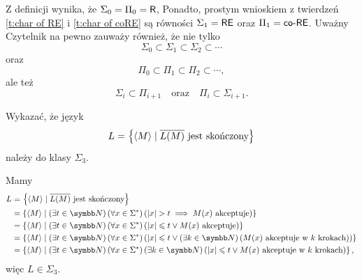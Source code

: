 Z definicji wynika, że $\Sigma_0 = \Pi_0 = \textsf{R}$, Ponadto, prostym wnioskiem z twierdzeń \ref{t:char of RE} i \ref{t:char of coRE} są równości $\Sigma_1 = \textsf{RE}$ oraz $\Pi_1 = \textsf{co-RE}$. Uważny Czytelnik na pewno zauważy również, że nie tylko
\[ \Sigma_0 \subset \Sigma_1 \subset \Sigma_2 \subset \cdots \]
oraz
\[ \Pi_0 \subset \Pi_1 \subset \Pi_2 \subset \cdots, \]
ale też
\[ \Sigma_i \subset \Pi_{i + 1} \quad\text{oraz}\quad \Pi_i \subset \Sigma_{i+1}. \]

\begin{example}
    Wykazać, że język
    \[ L = \left\{\left\langle M \right\rangle \mid \overline{L(M)} \text{ jest skończony}\right\} \]
    należy do klasy $\Sigma_3$.
\end{example}
\begin{solution}
Mamy
    \begin{align*}
        L &= \left\{\encode{M} \mid \ol{L(M)} \text{ jest skończony}\right\} \\
        &= \left\{\encode{M} \mid \left(\exists t \in \NN\right) \left(\forall x \in \Sigma^*\right) \left(|x| > t \implies M(x) \text{ akceptuje}\right)\right\} \\
        &= \left\{\encode{M} \mid \left(\exists t \in \NN\right) \left(\forall x \in \Sigma^*\right) \left(|x| \leq t \lor M(x) \text{ akceptuje}\right)\right\} \\
        &= \left\{\encode{M} \mid \left(\exists t \in \NN\right) \left(\forall x \in \Sigma^*\right) \left(|x| \leq t \lor \left(\exists k \in \NN\right) \left(M(x) \text{ akceptuje w } k \text{ krokach}\right)\right)\right\} \\
        &= \left\{\encode{M} \mid \left(\exists t \in \NN\right) \left(\forall x \in \Sigma^*\right) \left(\exists k \in \NN\right) \left(|x| \leq t \lor M(x) \text{ akceptuje w } k \text{ krokach}\right)\right\},
    \end{align*}
    więc $L \in \Sigma_3$.
\end{solution}

